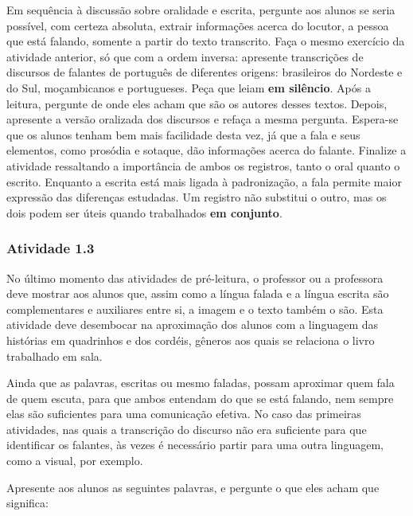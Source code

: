 \documentclass[11pt]{extarticle}
\begin{document}
Em sequência à discussão sobre oralidade e escrita, pergunte aos alunos se seria possível,
com certeza absoluta, extrair informações acerca do locutor, a pessoa que está falando, 
somente a partir do texto transcrito. Faça o mesmo exercício da atividade anterior, 
só que com a ordem inversa: apresente transcrições de discursos de falantes de português de diferentes
origens: brasileiros do Nordeste e do Sul, moçambicanos e portugueses. Peça que leiam \textbf{em silêncio}. 
Após a leitura, pergunte de onde eles acham que são os autores desses textos. 
Depois, apresente a versão oralizada dos discursos e refaça a mesma pergunta. 
Espera-se que os alunos tenham bem mais facilidade desta vez, já que a fala e seus elementos, 
como prosódia e sotaque, dão informações acerca do falante. 
Finalize a atividade ressaltando a importância de ambos os registros, tanto o oral quanto o escrito.
Enquanto a escrita está mais ligada à padronização, a fala permite maior expressão das diferenças estudadas. 
Um registro não substitui o outro, mas os dois podem ser úteis quando trabalhados \textbf{em conjunto}.


\subsubsection{Atividade 1.3}

No último momento das atividades de pré-leitura, o professor ou a professora deve 
mostrar aos alunos que, assim como a língua falada e a língua escrita são complementares
e auxiliares entre si, a imagem e o texto também o são. Esta atividade deve desembocar 
na aproximação dos alunos com a linguagem das histórias em quadrinhos e dos cordéis,
gêneros aos quais se relaciona o livro trabalhado em sala. 

Ainda que as palavras, escritas ou mesmo faladas, possam aproximar quem fala de quem escuta,
para que ambos entendam do que se está falando, nem sempre elas são suficientes para uma comunicação efetiva.
No caso das primeiras atividades, nas quais a transcrição do discurso não era suficiente para que
identificar os falantes, às vezes é necessário partir para uma 
outra linguagem, como a visual, por exemplo. 

Apresente aos alunos as seguintes palavras, e pergunte o que eles acham que significa:

\end{document}
